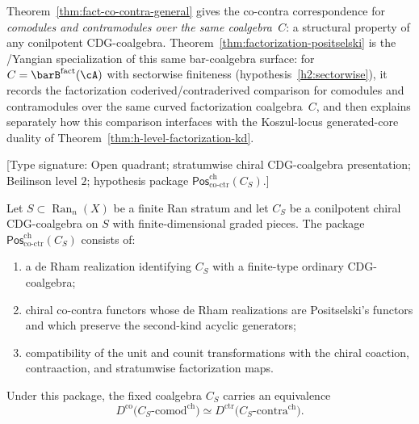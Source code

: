 \begin{remark}
\label{rem:fact-positselski-comparison}
Theorem~\ref{thm:fact-co-contra-general} gives the co-contra
correspondence for \emph{comodules and contramodules over the
same coalgebra~$C$}: a structural property of any conilpotent
CDG-coalgebra.
Theorem~\ref{thm:factorization-positselski} is the
\Eone/Yangian specialization of this same bar-coalgebra surface:
for $C = \barB^{\mathrm{fact}}(\cA)$ with sectorwise finiteness
\textup{(}hypothesis~\ref{h2:sectorwise}\textup{)}, it records the
factorization coderived/contraderived comparison for comodules and
contramodules over the same curved factorization coalgebra~$C$, and
then explains separately how this comparison interfaces with the
Koszul-locus generated-core duality of
Theorem~\ref{thm:h-level-factorization-kd}.
\end{remark}

\begin{theorem}
\label{thm:chiral-bar-cobar-positselski-7-2}
\textup{[Type signature: Open quadrant; stratumwise chiral
CDG-coalgebra presentation; Beilinson level \(2\); hypothesis package
\(\mathsf{Pos}^{\mathrm{ch}}_{\mathrm{co\text{-}ctr}}(C_S)\).]}

Let \(S\subset\operatorname{Ran}_n(X)\) be a finite Ran stratum and
let \(C_S\) be a conilpotent chiral CDG-coalgebra on \(S\) with
finite-dimensional graded pieces.  The package
\(\mathsf{Pos}^{\mathrm{ch}}_{\mathrm{co\text{-}ctr}}(C_S)\)
consists of:
\begin{enumerate}[label=\textup{(\roman*)}]
\item a de Rham realization identifying \(C_S\) with a finite-type
 ordinary CDG-coalgebra;
\item chiral co-contra functors whose de Rham realizations are
 Positselski's functors and which preserve the second-kind acyclic
 generators;
\item compatibility of the unit and counit transformations with the
 chiral coaction, contraaction, and stratumwise factorization maps.
\end{enumerate}
Under this package, the fixed coalgebra \(C_S\) carries an equivalence
\[
 D^{\mathrm{co}}
 \bigl(C_S\text{-}\mathrm{comod}^{\mathrm{ch}}\bigr)
 \simeq
 D^{\mathrm{ctr}}
 \bigl(C_S\text{-}\mathrm{contra}^{\mathrm{ch}}\bigr).
\]
\end{theorem}

